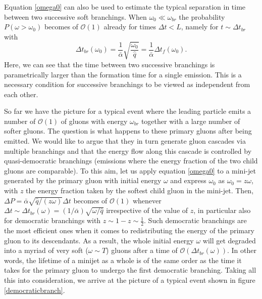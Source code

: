\documentclass[a4paper,12pt]{article}
\numberwithin{equation}{section}
\begin{document}
Equation \eqref{omega0} can also be used to estimate the typical separation in time between two successive soft branchings. When $\omega_0 \ll \omega_{br}$ the probability $P(\omega>\omega_0)$ becomes of $\mathcal{O}(1)$ already for times $ \Delta t < L$, namely for $t\sim \Delta t_{br}$ with
\begin{equation}
\Delta t_{br}(\omega_0)=\frac{1}{\bar{\alpha}} \sqrt{\frac{\omega_0}{\hat{q}}} = \frac{1}{\bar{\alpha}} \Delta t_f(\omega_0).
\end{equation}
Here, we can see that the time between two successive branchings is parametrically larger than the formation time for a single emission. This is a necessary condition for successive branchings to be viewed as independent from each other. 

So far we have the picture for a typical event where the leading particle emits a number of $\mathcal{O}(1)$ of gluons with energy $\omega_{br}$ together with a large number of softer gluons. The question is what happens to these primary gluons after being emitted. We would like to argue that they in turn generate gluon cascades via multiple branchings and that the energy flow along this cascade is controlled by quasi-democratic branchings (emissions where the energy fraction of the two child gluons are comparable)\cite{PRL}.  To this aim, let us apply equation \eqref{omega0} to a mini-jet generated by the primary gluon with initial energy $\omega$ and express $\omega_0$ as $\omega_0=z\omega$, with $z$ the energy fraction taken by the softest child gluon in the mini-jet. Then, $\Delta P = \bar{\alpha} \sqrt{{\hat{q}}/{(z \omega)}}\Delta t$ becomes of $\mathcal{O}(1)$ whenever $\Delta t \sim \Delta t_{br}(\omega)=({1}/{\bar{\alpha}}) \sqrt{{\omega}/{\hat{q}}}$ irrespective of the value of $z$, in particular also for democratic branchings with $z \sim 1-z \sim \frac{1}{2}$. Such democratic branchings are the most efficient ones when it comes to redistributing the energy of the primary gluon to its descendants. As a result, the whole initial energy $\omega$ will get degraded into a myriad of very soft ($\omega \sim T$) gluons after a time of $\mathcal{O}(\Delta t_{br}(\omega))$. In other words, the lifetime of a minijet as a whole is of the same order as the time it takes for the primary gluon to undergo the first democratic branching.
Taking all this into consideration, we arrive at the picture of a typical event shown in figure \ref{democraticbranch}.
\end{document}
